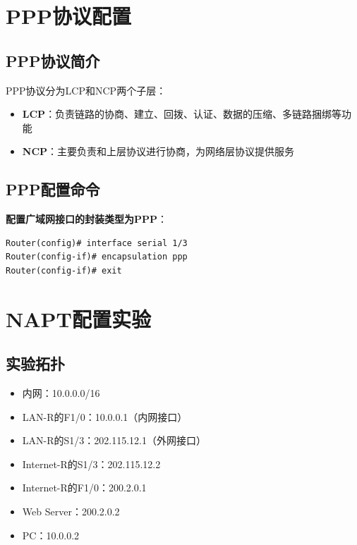 \documentclass[12pt,a4paper]{ctexart}
\begin{document}
\section{PPP协议配置}

\subsection{PPP协议简介}

PPP协议分为LCP和NCP两个子层：
\begin{itemize}[leftmargin=2em,itemsep=0pt]
    \item \textbf{LCP}：负责链路的协商、建立、回拨、认证、数据的压缩、多链路捆绑等功能
    \item \textbf{NCP}：主要负责和上层协议进行协商，为网络层协议提供服务
\end{itemize}

\subsection{PPP配置命令}

\begin{cmdbox}
\textbf{配置广域网接口的封装类型为PPP}：
\begin{lstlisting}
Router(config)# interface serial 1/3
Router(config-if)# encapsulation ppp
Router(config-if)# exit
\end{lstlisting}
\end{cmdbox}

\section{NAPT配置实验}

\subsection{实验拓扑}

\begin{itemize}[leftmargin=2em,itemsep=0pt]
    \item 内网：10.0.0.0/16
    \item LAN-R的F1/0：10.0.0.1（内网接口）
    \item LAN-R的S1/3：202.115.12.1（外网接口）
    \item Internet-R的S1/3：202.115.12.2
    \item Internet-R的F1/0：200.2.0.1
    \item Web Server：200.2.0.2
    \item PC：10.0.0.2
\end{itemize}
\end{document}
